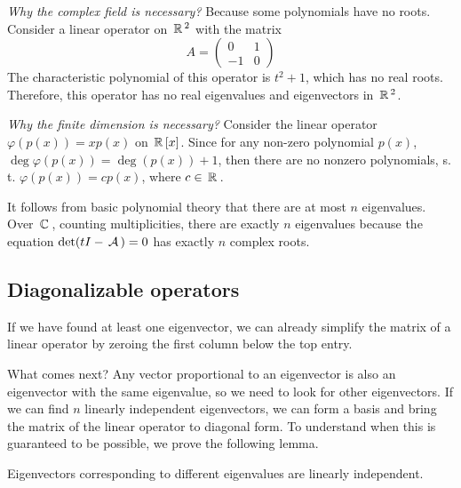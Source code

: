 \begin{example}
{\it Why the complex field is necessary?} Because some polynomials have no roots. Consider a linear operator on $\,\mathbb{R}\,^2$ with the matrix
$$
A = \begin{pmatrix}
    0 & 1 \\
    -1 & 0
\end{pmatrix}
$$
The characteristic polynomial of this operator is $t^2 + 1$, which has no real roots. Therefore, this operator has no real eigenvalues and eigenvectors in $\,\mathbb{R}\,^2$.
\end{example}

\begin{example}
{\it Why the finite dimension is necessary?} Consider the linear operator $\varphi(p(x)) = xp(x)$ on $\,\mathbb{R}\,[x]$. Since for any non-zero polynomial $p(x)$, $\deg\varphi(p(x)) = \deg(p(x)) + 1$, then there are no nonzero polynomials, s. t. $\varphi(p(x)) = cp(x)$, where $c\in \,\mathbb{R}\,$.
\end{example}
    
It follows from basic polynomial theory that there are at most $n$ eigenvalues. Over $\,\mathbb{C}\,$, counting multiplicities, there are exactly $n$ eigenvalues because the equation $\det(tI - \,\mathcal{A}\,) = 0$ has exactly $n$ complex roots.

\subsection{Diagonalizable operators}

If we have found at least one eigenvector, we can already simplify the matrix of a linear operator by zeroing the first column below the top entry.

What comes next? Any vector proportional to an eigenvector is also an eigenvector with the same eigenvalue, so we need to look for other eigenvectors. If we can find $n$ linearly independent eigenvectors, we can form a basis and bring the matrix of the linear operator to diagonal form. To understand when this is guaranteed to be possible, we prove the following lemma.

\begin{lemma}
Eigenvectors corresponding to different eigenvalues are linearly independent.
\end{lemma}

